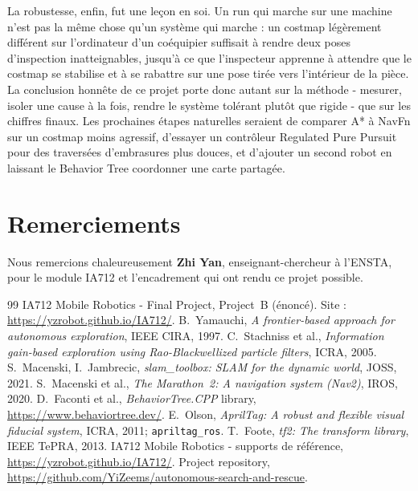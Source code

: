 \documentclass[11pt,a4paper]{article}
\begin{document}
La robustesse, enfin, fut une leçon en soi. Un run qui marche sur une machine n'est pas la même chose
qu'un système qui marche : un costmap légèrement différent sur l'ordinateur d'un coéquipier suffisait à
rendre deux poses d'inspection inatteignables, jusqu'à ce que l'inspecteur apprenne à attendre que le
costmap se stabilise et à se rabattre sur une pose tirée vers l'intérieur de la pièce. La conclusion
honnête de ce projet porte donc autant sur la méthode - mesurer, isoler une cause à la fois, rendre le
système tolérant plutôt que rigide - que sur les chiffres finaux. Les prochaines étapes naturelles
seraient de comparer A* à NavFn sur un costmap moins agressif, d'essayer un contrôleur Regulated Pure
Pursuit pour des traversées d'embrasures plus douces, et d'ajouter un second robot en laissant le
Behavior Tree coordonner une carte partagée.

\section*{Remerciements}
Nous remercions chaleureusement \textbf{Zhi Yan}, enseignant-chercheur à l'ENSTA, pour le module IA712 et
l'encadrement qui ont rendu ce projet possible.

\renewcommand{\refname}{Références}
\begingroup
\small
\begin{thebibliography}{99}
\setlength{\itemsep}{0pt}
 IA712 Mobile Robotics - Final Project, Project~B (énoncé). Site : \url{https://yzrobot.github.io/IA712/}.
 B.~Yamauchi, \emph{A frontier-based approach for autonomous exploration}, IEEE CIRA, 1997.
 C.~Stachniss et al., \emph{Information gain-based exploration using Rao-Blackwellized particle filters}, ICRA, 2005.
 S.~Macenski, I.~Jambrecic, \emph{slam\_toolbox: SLAM for the dynamic world}, JOSS, 2021.
 S.~Macenski et al., \emph{The Marathon~2: A navigation system (Nav2)}, IROS, 2020.
 D.~Faconti et al., \emph{BehaviorTree.CPP} library, \url{https://www.behaviortree.dev/}.
 E.~Olson, \emph{AprilTag: A robust and flexible visual fiducial system}, ICRA, 2011; \texttt{apriltag\_ros}.
 T.~Foote, \emph{tf2: The transform library}, IEEE TePRA, 2013.
 IA712 Mobile Robotics - supports de référence, \url{https://yzrobot.github.io/IA712/}.
 Project repository, \url{https://github.com/YiZeems/autonomous-search-and-rescue}.
\end{thebibliography}
\endgroup
\end{document}
